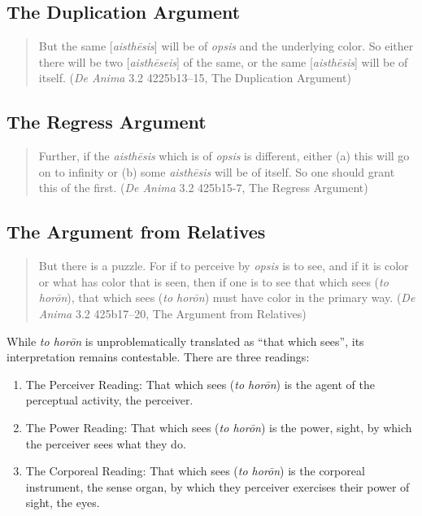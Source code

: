 
\subsection{The Duplication Argument} %
\label{sub:the_duplication_argument}

\begin{quote}
	But the same [\emph{aisthēsis}] will be of \emph{opsis} and the underlying color. So either there will be two [\emph{aisthēseis}] of the same, or the same [\emph{aisthēsis}] will be of itself. (\emph{De Anima} 3.2 4225b13–15, The Duplication Argument)
\end{quote}


\subsection{The Regress Argument} %
\label{sub:the_regress_argument}

\begin{quote}
	Further, if the \emph{aisthēsis} which is of \emph{opsis} is different, either (a) this will go on to infinity or (b) some \emph{aisthēsis} will be of itself. So one should grant this of the first. (\emph{De Anima} 3.2 425b15-7, The Regress Argument)
\end{quote}


\subsection{The Argument from Relatives} %
\label{sub:the_argument_from_relatives}

\begin{quote}
	But there is a puzzle. For if to perceive by \emph{opsis} is to see, and if it is color or what has color that is seen, then if one is to see that which sees (\emph{to horōn}), that which sees (\emph{to horōn}) must have color in the primary way. (\emph{De Anima} 3.2 425b17–20, The Argument from Relatives)
\end{quote}

While \emph{to horōn} is unproblematically translated as ``that which sees'', its interpretation remains contestable. There are three readings:
\begin{enumerate}[(1)]
	\item The Perceiver Reading: That which sees (\emph{to horōn}) is the agent of the perceptual activity, the perceiver.
	\item The Power Reading: That which sees (\emph{to horōn}) is the power, sight, by which the perceiver sees what they do.
	\item The Corporeal Reading: That which sees (\emph{to horōn}) is the corporeal instrument, the sense organ, by which they perceiver exercises their power of sight, the eyes.
\end{enumerate}

